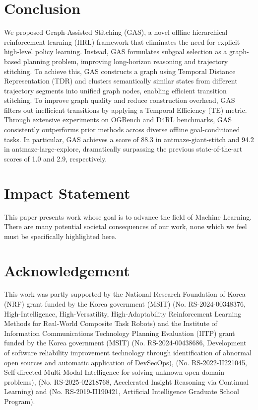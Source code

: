 \documentclass{article}
\begin{document}
\section{Conclusion}
We proposed Graph-Assisted Stitching (GAS), a novel offline hierarchical reinforcement learning (HRL) framework that eliminates the need for explicit high-level policy learning. Instead, GAS formulates subgoal selection as a graph-based planning problem, improving long-horizon reasoning and trajectory stitching. To achieve this, GAS constructs a graph using Temporal Distance Representation (TDR) and clusters semantically similar states from different trajectory segments into unified graph nodes, enabling efficient transition stitching. To improve graph quality and reduce construction overhead, GAS filters out inefficient transitions by applying a Temporal Efficiency (TE) metric. Through extensive experiments on OGBench and D4RL benchmarks, GAS consistently outperforms prior methods across diverse offline goal-conditioned tasks. In particular, GAS achieves a score of 88.3 in antmaze-giant-stitch and 94.2 in antmaze-large-explore, dramatically surpassing the previous state-of-the-art scores of 1.0 and 2.9, respectively.


\section*{Impact Statement}
This paper presents work whose goal is to advance the field of Machine Learning. There are many potential societal consequences of our work, none which we feel must be specifically highlighted here.

\section*{Acknowledgement} This work was partly supported by the National Research Foundation of Korea (NRF) grant funded by the Korea government (MSIT) (No. RS-2024-00348376, High-Intelligence, High-Versatility, High-Adaptability Reinforcement Learning Methods for Real-World Composite Task Robots) and the Institute of Information Communications Technology Planning Evaluation (IITP) grant funded by the Korea government (MSIT) (No. RS-2024-00438686, Development of software reliability improvement technology through identification of abnormal open sources and automatic application of DevSecOps), (No. RS-2022-II221045, Self-directed Multi-Modal Intelligence for solving unknown open domain problems), (No. RS-2025-02218768, Accelerated Insight Reasoning via Continual Learning) and (No. RS-2019-II190421, Artificial Intelligence Graduate School Program).
\end{document}
